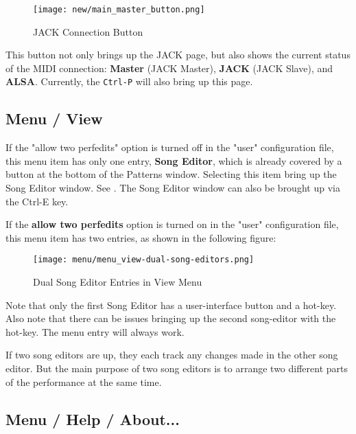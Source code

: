 \begin{figure}[H]
   \centering 
   \texttt{[image: new/main\_master\_button.png]}
   \caption{JACK Connection Button}
   \label{fig:seq64_main_master_button}
\end{figure}

   This button not only brings up the JACK page, but also shows the current
   status of the MIDI connection:
   \textbf{Master} (JACK Master),
   \textbf{JACK} (JACK Slave), and
   \textbf{ALSA}.
   Currently, the \texttt{Ctrl-P} will also bring up this page.

\subsection{Menu / View}
\label{subsec:seq64_menu_view}

   If the "allow two perfedits" option is turned off in the "user"
   configuration file, this menu item has only one entry, \textbf{Song Editor}, 
   which is already covered by a button at the bottom of the Patterns
   window.  Selecting this item bring up the Song Editor window.
   See .
   The Song Editor window can also be brought up via the
   Ctrl-E key.

   If the \textbf{allow two perfedits} option is turned on in the "user"
   configuration file, this menu item has two entries, as shown in the
   following figure:

\begin{figure}[H]
   \centering 
   \texttt{[image: menu/menu\_view-dual-song-editors.png]}
   \caption{Dual Song Editor Entries in View Menu}
   \label{fig:seq64_menu_view_song_editors}
\end{figure}

   Note that only the first Song Editor has a user-interface button and
   a hot-key.  Also note that there can be issues bringing up the second
   song-editor with the hot-key.  The menu entry will always work.

   If two song editors are up, they each track any changes made in the other
   song editor.  But the main purpose of two song editors is to arrange two
   different parts of the performance at the same time.

\subsection{Menu / Help / About...}
\label{subsec:seq64_menu_about}

